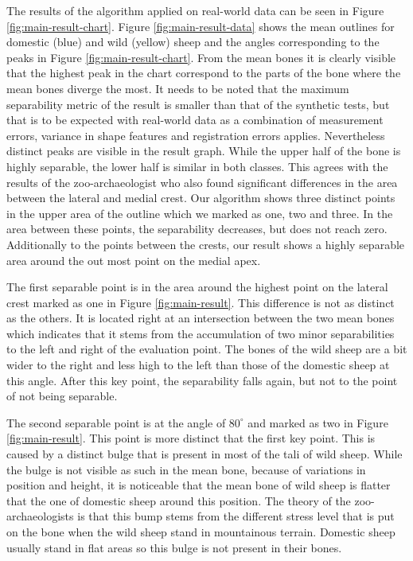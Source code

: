 \documentclass[pdftex,12pt,a4paper]{report}
\begin{document}
The results of the algorithm applied on real-world data can be seen in Figure \ref{fig:main-result-chart}. Figure \ref{fig:main-result-data} shows the mean outlines for domestic (blue) and wild (yellow) sheep and the angles corresponding to the peaks in Figure \ref{fig:main-result-chart}. From the mean bones it is clearly visible that the highest peak in the chart correspond to the parts of the bone where the mean bones diverge the most. It needs to be noted that the maximum separability metric of the result is smaller than that of the synthetic tests, but that is to be expected with real-world data as a combination of measurement errors, variance in shape features and registration errors applies. Nevertheless distinct peaks are visible in the result graph. While the upper half of the bone is highly separable, the lower half is similar in both classes. This agrees with the results of the zoo-archaeologist who also found significant differences in the area between the lateral and medial crest. Our algorithm shows three distinct points in the upper area of the outline which we marked as one, two and three. In the area between these points, the separability decreases, but does not reach zero. Additionally to the points between the crests, our result shows a highly separable area around the out most point on the medial apex.

The first separable point is in the area around the highest point on the lateral crest marked as one in Figure \ref{fig:main-result}. This difference is not as distinct as the others. It is located right at an intersection between the two mean bones which indicates that it stems from the accumulation of two minor separabilities to the left and right of the evaluation point. The bones of the wild sheep are a bit wider to the right and less high to the left than those of the domestic sheep at this angle. After this key point, the separability falls again, but not to the point of not being separable.

The second separable point is at the angle of $80^\circ$ and marked as two in Figure \ref{fig:main-result}. This point is more distinct that the first key point. This is caused by a distinct bulge that is present in most of the tali of wild sheep. While the bulge is not visible as such in the mean bone, because of variations in position and height, it is noticeable that the mean bone of wild sheep is flatter that the one of domestic sheep around this position. The theory of the zoo-archaeologists is that this bump stems from the different stress level that is put on the bone when the wild sheep stand in mountainous terrain. Domestic sheep usually stand in flat areas so this bulge is not present in their bones.
\end{document}
